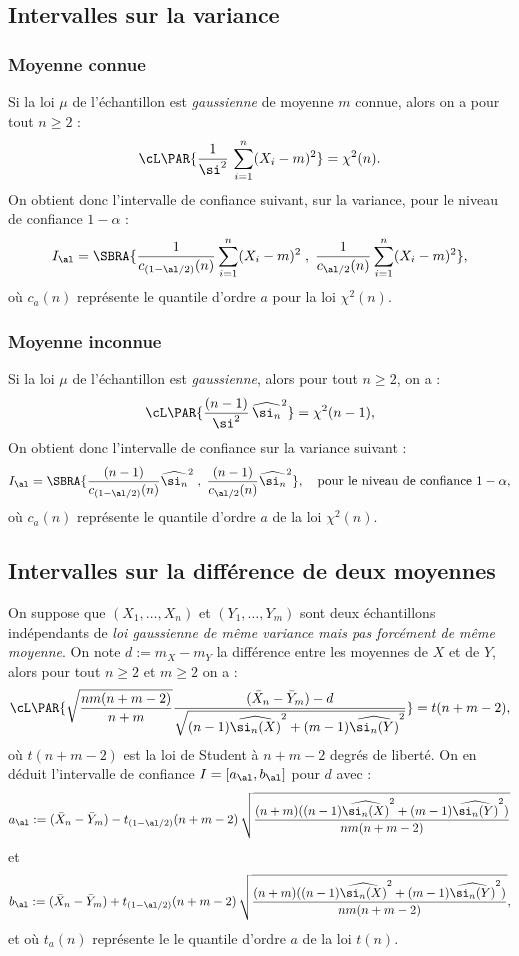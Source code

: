 \subsection{Intervalles sur la variance} 


\subsubsection{Moyenne connue} 

Si la loi $\mu$ de l'échantillon est \emph{gaussienne} de moyenne $m$ connue,
alors on a pour tout $n \geq 2$ :
$$
\cL\PAR{\frac{1}{\si^2}\,\sum_{i=1}^n (X_i-m)^2}= \chi^2 (n).
$$
On obtient donc l'intervalle de confiance suivant, sur la variance, pour le
niveau de confiance $1-\alpha$ :
$$
I_\al=\SBRA{\frac{1}{c_{(1-\al/2)}(n)}\sum_{i=1}^n (X_i-m)^2\;,\;
  \frac{1}{c_{\al/2}(n)}\sum_{i=1}^n (X_i-m)^2},
$$
où $c_a(n)$ représente le quantile d'ordre $a$ pour la loi $\chi^2(n)$.

\subsubsection{Moyenne inconnue} 

Si la loi $\mu$ de l'échantillon est \emph{gaussienne}, alors
pour tout $n \geq 2$, on a :
$$
\cL\PAR{\frac{(n-1)}{\si^2}\,\widehat{\si_n}^2} = \chi^2 (n-1),
$$
On obtient donc l'intervalle de confiance sur la variance suivant :
$$
I_\al=\SBRA{\frac{(n-1)}{c_{(1-\al/2)}(n)}\widehat{\si_n}^2\;,\; 
  \frac{(n-1)}{c_{\al/2}(n)}\widehat{\si_n}^2},
\text{\quad pour le niveau de confiance $1-\alpha$},
$$
où $c_a(n)$ représente le quantile d'ordre $a$ de la loi $\chi^2(n)$.

\subsection{Intervalles sur la différence de deux moyennes}

On suppose que $(X_1,\ldots,X_n)$ et $(Y_1,\ldots,Y_m)$ sont deux échantillons
indépendants de \emph{loi gaussienne de même variance mais pas forcément de
  même moyenne}. On note $d:=m_X-m_Y$ la différence entre les moyennes de $X$
et de $Y$, alors pour tout $n \geq 2$ et $m \geq 2$ on a :
$$ 
\cL\PAR{
\sqrt{\frac{nm(n+m-2)}{n+m}} 
\frac{(\bar{X}_n-\bar{Y}_m)-d}
{\sqrt{(n-1)\widehat{\si_n(X)}^2+(m-1)\widehat{\si_n(Y)}^2}}}
=t(n+m-2),
$$
où $t(n+m-2)$ est la loi de Student à $n+m-2$ degrés de liberté. On en
déduit l'intervalle de confiance $I=[a_\al,b_\al]$ pour $d$ avec :
$$
a_\al:=(\bar{X}_n-\bar{Y}_m)-t_{(1-\al/2)}(n+m-2)\,
       \sqrt{\frac{(n+m)((n-1)\widehat{\si_n(X)}^2
                     +(m-1)\widehat{\si_n(Y)}^2)}{nm(n+m-2)}}
$$
et
$$
b_\al:=(\bar{X}_n -\bar{Y}_m)+t_{(1-\al/2)}(n+m-2)\,
       \sqrt{\frac{(n+m)((n-1)\widehat{\si_n(X)}^2
                   +(m-1)\widehat{\si_n(Y)}^2)}{nm(n+m-2)}},
$$
et où $t_a(n)$ représente le le quantile d'ordre $a$ de la loi $t(n)$.


